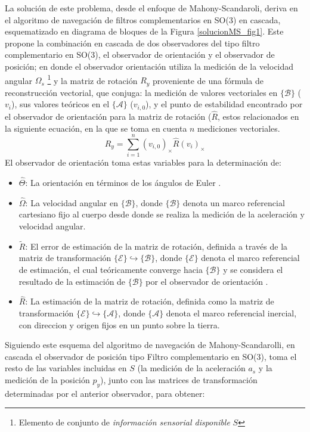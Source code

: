 \documentclass[conference]{IEEEtran}
\newcommand{\marco}[1]{\{\mathcal{#1}\}}
\begin{document}
La solución de este problema, desde el enfoque de Mahony-Scandaroli, deriva en el algoritmo de navegación de filtros complementarios en SO(3) en cascada, esquematizado en diagrama de bloques de la Figura \ref{solucionMS_fig1}. Este propone la combinación en cascada de dos observadores del tipo filtro complementario en SO(3), el observador de orientación y el observador de posición; en donde el observador orientación utiliza la medición de la velocidad angular $\Omega_s$ \footnote{ Elemento de conjunto de \emph{información sensorial disponible} $S$} y la matriz de rotación $R_y$ proveniente de una fórmula de  reconstrucción vectorial,  que conjuga: la medición de valores vectoriales en $\marco{B}$ ($v_i$), sus valores teóricos en el $\marco{A}$ ($v_{i,0}$), y el punto de estabilidad encontrado por el observador de orientación para la matriz de rotación ($\hat{R}$, estos relacionados en la siguiente ecuación, en la que se toma en cuenta $n$ mediciones vectoriales.
\begin{equation}\label{ReconstruccionVectorial}
R_y=\sum_{i=1}^{n}(v_{i,0})_\times\hat{R}(v_i)_\times
\end{equation}
El observador de orientación toma estas variables para la determinación de: 
\begin{itemize}
\item $\hat{\Theta}$: La orientación en términos de los ángulos de Euler .
\item  $\hat{\Omega}$: La velocidad angular en $\marco{B}$, donde $\marco{B}$ denota un marco referencial cartesiano fijo al cuerpo desde donde se realiza la medición de la aceleración y velocidad angular.
\item $\tilde{R}$: El error de estimación de la matriz de rotación, definida a través de la matriz de transformación $\marco{E}\hookrightarrow\marco{B}$, donde $\marco{E}$ denota el marco referencial de estimación, el cual teóricamente converge hacia $\marco{B}$ y se considera el resultado de la estimación de $\marco{B}$ por el observador de orientación .
\item $\hat{R}$: La estimación de la matriz de rotación, definida como la matriz de transformación $ \marco{E}\hookrightarrow\marco{A}$,  donde $\marco{A}$ denota el marco referencial inercial, con direccion y origen fijos en un punto sobre la tierra.
\end{itemize}
Siguiendo este esquema del algoritmo de navegación de Mahony-Scandarolli, en cascada el observador de posición tipo Filtro complementario en SO(3), toma el resto de las variables incluidas en $S$ (la medición de la aceleración $a_s$ y la medición de la posición $p_y$), junto con las matrices de transformación determinadas por el anterior observador, para obtener:
\end{document}
